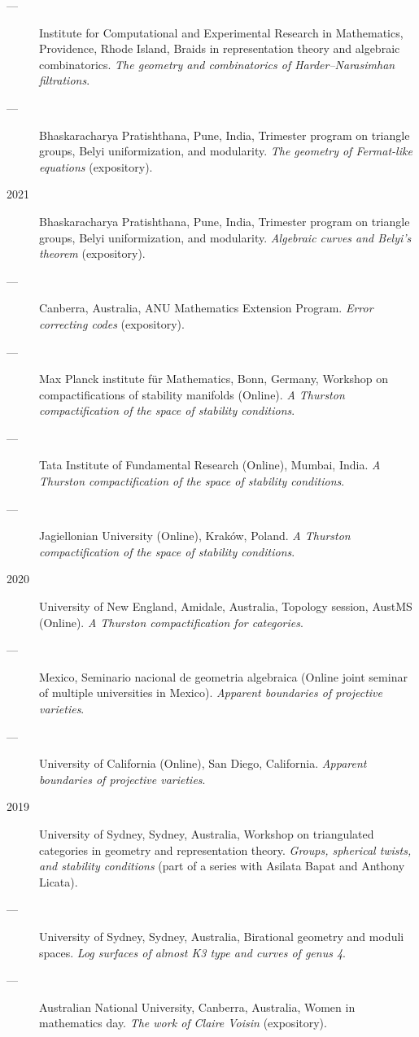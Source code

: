 \documentclass[11pt]{article}
\begin{document}
\begin{description}
\item[{---}] Institute for Computational and Experimental Research in Mathematics, Providence, Rhode Island, Braids in representation theory and algebraic combinatorics. \emph{The geometry and combinatorics of Harder--Narasimhan filtrations}.
\item[{---}] Bhaskaracharya Pratishthana, Pune, India, Trimester program on triangle groups, Belyi uniformization, and modularity. \emph{The geometry of Fermat-like equations} (expository).
\item[{2021}] Bhaskaracharya Pratishthana, Pune, India, Trimester program on triangle groups, Belyi uniformization, and modularity. \emph{Algebraic curves and Belyi's theorem} (expository).
\item[{---}] Canberra, Australia, ANU Mathematics Extension Program. \emph{Error correcting codes} (expository).
\item[{---}] Max Planck institute für Mathematics, Bonn, Germany, Workshop on compactifications of stability manifolds (Online). \emph{A Thurston compactification of the space of stability conditions}.
\item[{---}] Tata Institute of Fundamental Research (Online), Mumbai, India. \emph{A Thurston compactification of the space of stability conditions}.
\item[{---}] Jagiellonian University (Online), Kraków, Poland. \emph{A Thurston compactification of the space of stability conditions}.
\item[{2020}] University of New England, Amidale, Australia, Topology session, AustMS (Online). \emph{A Thurston compactification for categories}.
\item[{---}] Mexico, Seminario nacional de geometria algebraica (Online joint seminar of multiple universities in Mexico). \emph{Apparent boundaries of projective varieties}.
\item[{---}] University of California (Online), San Diego, California. \emph{Apparent boundaries of projective varieties}.
\item[{2019}] University of Sydney, Sydney, Australia, Workshop on triangulated categories in geometry and representation theory. \emph{Groups, spherical twists, and stability conditions} (part of a series with Asilata Bapat and Anthony Licata).
\item[{---}] University of Sydney, Sydney, Australia, Birational geometry and moduli spaces. \emph{Log surfaces of almost K3 type and curves of genus 4}.
\item[{---}] Australian National University, Canberra, Australia, Women in mathematics day. \emph{The work of Claire Voisin} (expository).

\end{description}
\end{document}
